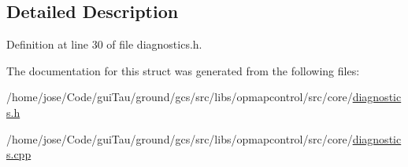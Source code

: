 \subsection{Detailed Description}


Definition at line 30 of file diagnostics.\-h.



The documentation for this struct was generated from the following files\-:\begin{DoxyCompactItemize}
\item 
/home/jose/\-Code/gui\-Tau/ground/gcs/src/libs/opmapcontrol/src/core/\hyperlink{diagnostics_8h}{diagnostics.\-h}\item 
/home/jose/\-Code/gui\-Tau/ground/gcs/src/libs/opmapcontrol/src/core/\hyperlink{diagnostics_8cpp}{diagnostics.\-cpp}\end{DoxyCompactItemize}

